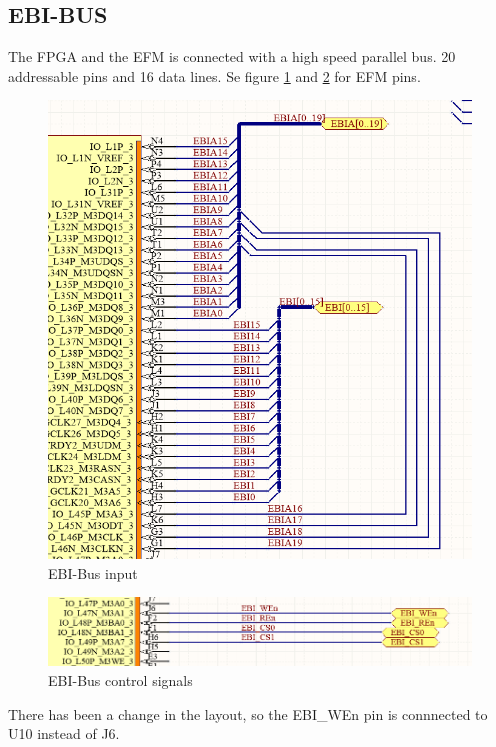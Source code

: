 \subsection{EBI-BUS}
The FPGA and the EFM is connected with a high speed parallel bus. 20 addressable pins and 16 data lines.  Se figure \ref{fig:EbiBus} and \ref{fig:EbiControl} for EFM pins.


\begin{figure}
    \includegraphics[width=\linewidth]{img/EBI-bus.png}
    \caption{EBI-Bus input}
    \label{fig:EbiBus}
\end{figure}

\begin{figure}
    \includegraphics[width=\linewidth]{img/EBI-bus_2.png}
    \caption{EBI-Bus control signals}
    \label{fig:EbiControl}
\end{figure}

There has been a change in the layout, so the EBI\_WEn pin is connnected to U10 instead of J6.


